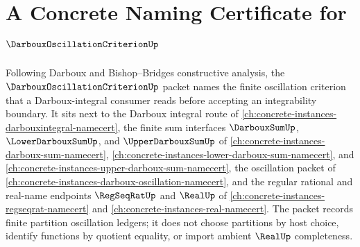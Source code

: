 \chapter{A Concrete Naming Certificate for $\DarbouxOscillationCriterionUp$}
\label{ch:concrete-instances-darboux-oscillation-criterion-namecert}

Following Darboux and Bishop--Bridges constructive analysis, the $\DarbouxOscillationCriterionUp$ packet names the finite oscillation criterion that a Darboux-integral consumer reads before accepting an integrability boundary. It sits next to the Darboux integral route of \autoref{ch:concrete-instances-darbouxintegral-namecert}, the finite sum interfaces $\DarbouxSumUp$, $\LowerDarbouxSumUp$, and $\UpperDarbouxSumUp$ of \autoref{ch:concrete-instances-darboux-sum-namecert}, \autoref{ch:concrete-instances-lower-darboux-sum-namecert}, and \autoref{ch:concrete-instances-upper-darboux-sum-namecert}, the oscillation packet of \autoref{ch:concrete-instances-darboux-oscillation-namecert}, and the regular rational and real-name endpoints $\RegSeqRatUp$ and $\RealUp$ of \autoref{ch:concrete-instances-regseqrat-namecert} and \autoref{ch:concrete-instances-real-namecert}. The packet records finite partition oscillation ledgers; it does not choose partitions by host choice, identify functions by quotient equality, or import ambient $\RealUp$ completeness.

